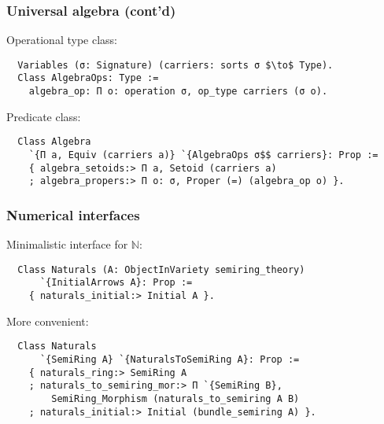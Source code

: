 \documentclass{beamer}
\begin{document}
\begin{frame}[fragile]
\frametitle{Universal algebra (cont'd)}
Operational type class:
\begin{lstlisting}
  Variables (σ: Signature) (carriers: sorts σ $\to$ Type).
  Class AlgebraOps: Type :=
    algebra_op: Π o: operation σ, op_type carriers (σ o).
\end{lstlisting}
Predicate class:
\begin{lstlisting}
  Class Algebra
    `{Π a, Equiv (carriers a)} `{AlgebraOps σ$$ carriers}: Prop :=
    { algebra_setoids:> Π a, Setoid (carriers a)
    ; algebra_propers:> Π o: σ, Proper (=) (algebra_op o) }.
\end{lstlisting}
\end{frame}


\begin{frame}[fragile]
\frametitle{Numerical interfaces}

Minimalistic interface for $\mathbb{N}$:
\begin{lstlisting}
  Class Naturals (A: ObjectInVariety semiring_theory)
      `{InitialArrows A}: Prop :=
    { naturals_initial:> Initial A }.
\end{lstlisting}

More convenient: %
\begin{lstlisting}
  Class Naturals
      `{SemiRing A} `{NaturalsToSemiRing A}: Prop :=
    { naturals_ring:> SemiRing A
    ; naturals_to_semiring_mor:> Π `{SemiRing B},
        SemiRing_Morphism (naturals_to_semiring A B)
    ; naturals_initial:> Initial (bundle_semiring A) }.
\end{lstlisting}
\end{frame}
\end{document}
